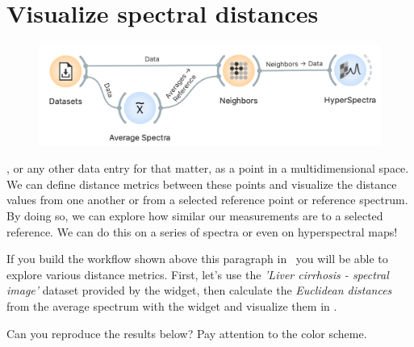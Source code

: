 \chapter{Visualize spectral distances}
\label{ch:visualize-spectral-distances}

\begin{figure}
	\vspace{-1.5 cm}
    \includegraphics[scale=0.6]{ch-visualize_spectral_distances-fig1.png}
\end{figure}

, or any other data entry for that matter, as a point in a multidimensional space. We can define distance metrics between these points and visualize the distance values from one another or from a selected reference point or reference spectrum. By doing so, we can explore how similar our measurements are to a selected reference. We can do this on a series of spectra or even on hyperspectral maps!

If you build the workflow shown above this paragraph in \mutation\ you will be able to explore various distance metrics. First, let's use the \textit{'Liver cirrhosis - spectral image'} dataset provided by the  widget, then calculate the \textit{Euclidean distances} from the average spectrum with the  widget and visualize them in . 

\medskip
Can you reproduce the results below? Pay attention to the color scheme.

